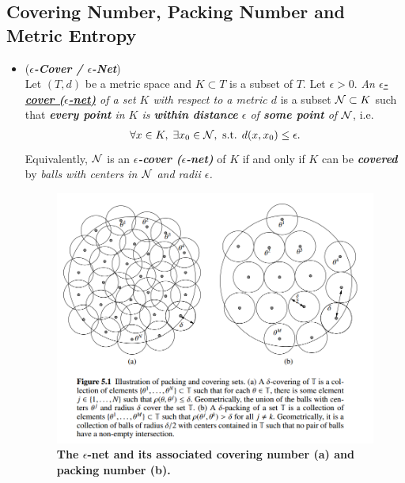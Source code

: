 \documentclass[11pt]{article}
\begin{document}
\subsection{Covering Number, Packing Number and Metric Entropy}
\begin{itemize}
\item \begin{definition}(\emph{\textbf{$\epsilon$-Cover / $\epsilon$-Net}}) \citep{vershynin2018high} \\
Let $(T, d)$ be a metric space and  $K \subset T$ is a subset of $T$. Let $\epsilon > 0$.  \emph{An \underline{\textbf{$\epsilon$-cover ($\epsilon$-net)}} of a set $K$ with respect to a metric $d$} is a subset ${\mathcal N} \subset K$ such that \emph{\textbf{every point} in $K$ is \textbf{within distance} $\epsilon$ of \textbf{some point} of ${\mathcal N}$}, i.e.
\begin{align*}
\forall x \in K, \; \exists x_0 \in {\mathcal N}, \text{ s.t. }d(x, x_0) \le \epsilon.
\end{align*} Equivalently, ${\mathcal N}$ is an \emph{\textbf{$\epsilon$-cover ($\epsilon$-net)}} of $K$ if and only if $K$ can be \emph{\textbf{covered}} by \emph{balls with centers in ${\mathcal N}$ and radii $\epsilon$.}
\end{definition}

\begin{figure}
\begin{minipage}[t]{1\linewidth}
  \centering
  \centerline{\includegraphics[scale = 0.4]{epsilon_net_covering_packing_number.png}}
\end{minipage}
\caption{\footnotesize{\textbf{The $\epsilon$-net and its associated covering number (a) and packing number (b).  \citep{wainwright2019high}}}}
\label{fig: epsilon_net_covering_packing_number}
\end{figure}


\end{itemize}
\end{document}
